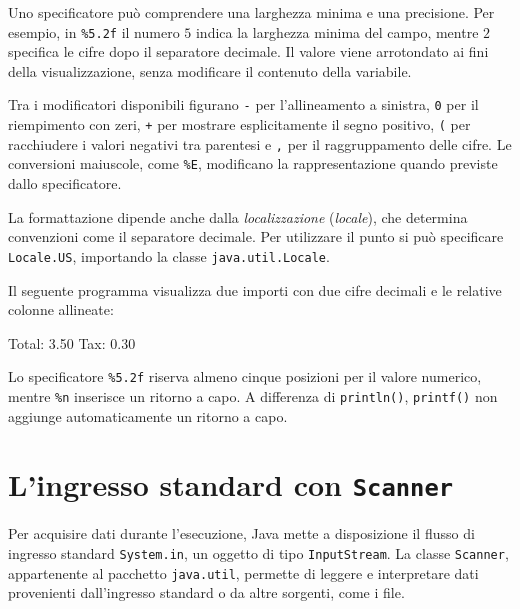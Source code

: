 Uno specificatore può comprendere una larghezza minima e una
precisione. Per esempio, in \lstinline|%5.2f| il numero
\(5\) indica la larghezza minima del campo, mentre \(2\)
specifica le cifre dopo il separatore decimale.
Il valore viene arrotondato ai fini della visualizzazione,
senza modificare il contenuto della variabile.

Tra i modificatori disponibili figurano \lstinline|-|
per l'allineamento a sinistra, \lstinline|0| per il
riempimento con zeri, \lstinline|+| per mostrare
esplicitamente il segno positivo, \lstinline|(| per
racchiudere i valori negativi tra parentesi e
\lstinline|,| per il raggruppamento delle cifre.
Le conversioni maiuscole, come \lstinline|%E|,
modificano la rappresentazione quando previste
dallo specificatore.

La formattazione dipende anche dalla \emph{localizzazione}
(\emph{locale}), che determina convenzioni come il
separatore decimale. Per utilizzare il punto si può
specificare \texttt{Locale.US}, importando la classe
\texttt{java.util.Locale}.

\begin{example}
Il seguente programma visualizza due importi con
due cifre decimali e le relative colonne allineate:



\begin{unipdterminal}
Total: 3.50
Tax:   0.30
\end{unipdterminal}

Lo specificatore \lstinline|%5.2f| riserva almeno
cinque posizioni per il valore numerico, mentre
\lstinline|%n| inserisce un ritorno a capo.
A differenza di \texttt{println()},
\texttt{printf()} non aggiunge automaticamente
un ritorno a capo.
\end{example}

\clearpage

\section{L'ingresso standard con \texttt{Scanner}}
\label{sec:fi-java-scanner}

Per acquisire dati durante l'esecuzione, Java mette a
disposizione il flusso di ingresso standard \texttt{System.in},
un oggetto di tipo \texttt{InputStream}. La classe \texttt{Scanner},
appartenente al pacchetto \texttt{java.util}, permette di leggere
e interpretare dati provenienti dall'ingresso standard o da altre
sorgenti, come i file.

